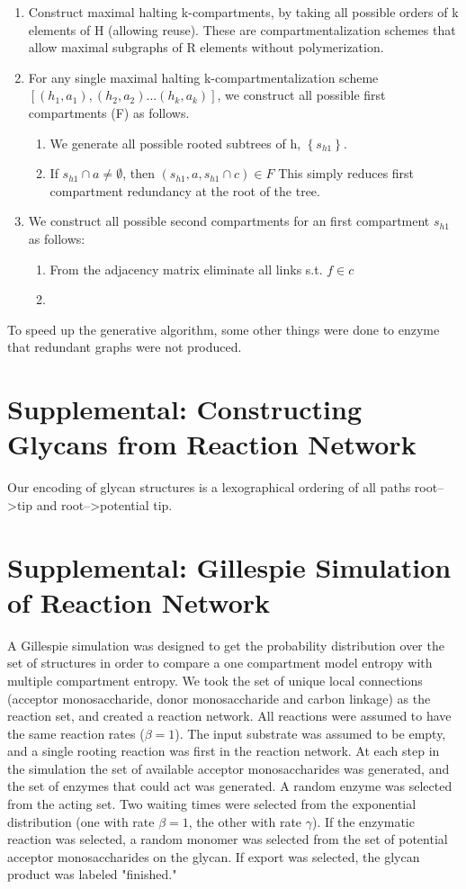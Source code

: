 \documentclass{article}
\begin{document}
\begin{enumerate}
	\item Construct maximal halting k-compartments, by taking all possible orders of k elements of H (allowing reuse). These are compartmentalization schemes that allow maximal subgraphs of R elements without polymerization.
	\item For any single maximal halting k-compartmentalization scheme $[(h_1,a_1),(h_2,a_2)...(h_k,a_k)]$, we construct all possible first compartments (F) as follows.
\begin{enumerate}
	\item We generate all possible rooted subtrees of h, $\left\{s_{h1}\right\}$. 
	\item If  $s_{h1}\cap a \neq \emptyset$, then $(s_{h1},a,s_{h1}\cap c)\in F$ This simply reduces first compartment redundancy at the root of the tree.
\end{enumerate} 
\item We construct all possible second compartments for an first compartment $s_{h1}$ as follows:
\begin{enumerate}
\item  From the adjacency matrix eliminate all links s.t. $f\in c$ 
\item 
\end{enumerate} 
\end{enumerate}

To speed up the generative algorithm, some other things were done to enzyme that redundant graphs were not produced.

\section*{Supplemental: Constructing Glycans from Reaction Network}
Our encoding of glycan structures is a lexographical ordering of all paths root-->tip and root-->potential tip. 

\section*{Supplemental: Gillespie Simulation of Reaction Network}
A Gillespie simulation was designed to get the probability distribution over the set of structures in order to compare a one compartment model entropy with multiple compartment entropy. We took the set of unique local connections (acceptor monosaccharide, donor monosaccharide and carbon linkage) as the reaction set, and created a reaction network. All reactions were assumed to have the same reaction rates ($\beta=1$). The input substrate was assumed to be empty, and a single rooting reaction was first in the reaction network. At each step in the simulation the set of available acceptor monosaccharides was generated, and the set of enzymes that could act was generated. A random enzyme was selected from the acting set. Two waiting times were selected from the exponential distribution (one with rate $\beta = 1$, the other with rate $\gamma$). If the enzymatic reaction was selected, a random monomer was selected from the set of potential acceptor monosaccharides on the glycan. If export was selected, the glycan product was labeled "finished."
\end{document}
